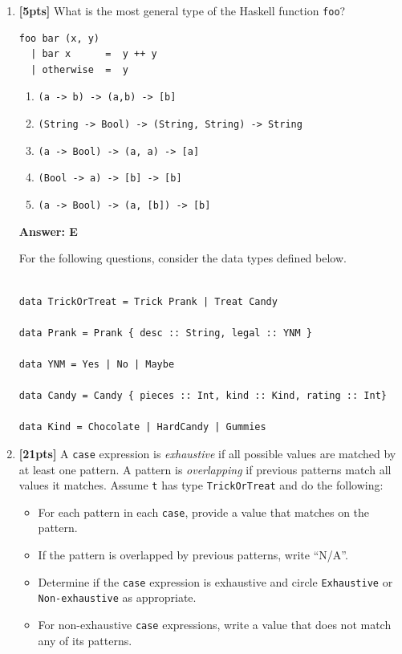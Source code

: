 \documentclass[paper=letter, fontsize=13pt]{article} %
\numberwithin{equation}{section} %
\newif\ifshowanswers\showanswerstrue
\begin{document}
\begin{enumerate}
\bigskip
\bigskip
\bigskip
\bigskip
\bigskip
  
\item \textbf{[5pts]} What is the most general type of the Haskell function \texttt{foo}?
\begin{lstlisting}
foo bar (x, y)
  | bar x      =  y ++ y
  | otherwise  =  y 
\end{lstlisting}
    \begin{enumerate} 
         \item \verb|(a -> b) -> (a,b) -> [b]|
         \item \verb|(String -> Bool) -> (String, String) -> String|
         \item \verb|(a -> Bool) -> (a, a) -> [a]|
         \item \verb|(Bool -> a) -> [b] -> [b]|
         \item \verb|(a -> Bool) -> (a, [b]) -> [b]|
     \end{enumerate}
\ifshowanswers
  \textbf{Answer: E}
\fi

\newpage
For the following questions, consider the data types defined below.
\begin{lstlisting}

data TrickOrTreat = Trick Prank | Treat Candy 

data Prank = Prank { desc :: String, legal :: YNM }

data YNM = Yes | No | Maybe

data Candy = Candy { pieces :: Int, kind :: Kind, rating :: Int}

data Kind = Chocolate | HardCandy | Gummies
\end{lstlisting}

\item \textbf{[21pts]} A \texttt{case} expression is \textit{exhaustive} if all possible values are matched
by at least one pattern. A pattern is \textit{overlapping} if previous patterns match all values it matches.
Assume \texttt{t} has type \texttt{TrickOrTreat} and do the following:
\begin{itemize}
  \item For each pattern in each \texttt{case}, provide a value that matches on the pattern.
  \item If the pattern is overlapped by previous patterns, write ``N/A''.
  \item Determine if the \texttt{case} expression is exhaustive and circle \texttt{Exhaustive} or \texttt{Non-exhaustive} as appropriate.
  \item For non-exhaustive \texttt{case} expressions, write a value that does not match any of its patterns.
\end{itemize}
\begin{enumerate}


\end{enumerate}
\end{enumerate}
\end{document}
